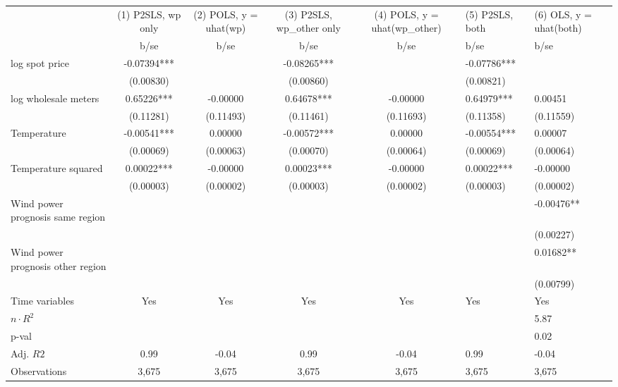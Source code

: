 \begin{tabular}{lcccc}\toprule
                    &(1) P2SLS, wp only   &(2) POLS, y = uhat(wp)   &(3) P2SLS, wp_other only   &(4) POLS, y = uhat(wp_other)   &(5) P2SLS, both   &(6) OLS, y = uhat(both)   \\
                    &        b/se   &        b/se   &        b/se   &        b/se   &        b/se   &        b/se   \\
\midrule
log spot price      &    -0.07394***&               &    -0.08265***&               &    -0.07786***&               \\
                    &   (0.00830)   &               &   (0.00860)   &               &   (0.00821)   &               \\
log wholesale meters&     0.65226***&    -0.00000   &     0.64678***&    -0.00000   &     0.64979***&     0.00451   \\
                    &   (0.11281)   &   (0.11493)   &   (0.11461)   &   (0.11693)   &   (0.11358)   &   (0.11559)   \\
Temperature         &    -0.00541***&     0.00000   &    -0.00572***&     0.00000   &    -0.00554***&     0.00007   \\
                    &   (0.00069)   &   (0.00063)   &   (0.00070)   &   (0.00064)   &   (0.00069)   &   (0.00064)   \\
Temperature squared &     0.00022***&    -0.00000   &     0.00023***&    -0.00000   &     0.00022***&    -0.00000   \\
                    &   (0.00003)   &   (0.00002)   &   (0.00003)   &   (0.00002)   &   (0.00003)   &   (0.00002)   \\
Wind power prognosis same region&               &               &               &               &               &    -0.00476** \\
                    &               &               &               &               &               &   (0.00227)   \\
Wind power prognosis other region&               &               &               &               &               &     0.01682** \\
                    &               &               &               &               &               &   (0.00799)   \\
Time variables      &         Yes   &         Yes   &         Yes   &         Yes   &         Yes   &         Yes   \\
\midrule
\(n\cdot R^2\)      &               &               &               &               &               &        5.87   \\
p-val               &               &               &               &               &               &        0.02   \\
Adj. \(R2\)         &        0.99   &       -0.04   &        0.99   &       -0.04   &        0.99   &       -0.04   \\
Observations        &       3,675   &       3,675   &       3,675   &       3,675   &       3,675   &       3,675   \\
\bottomrule\end{tabular}
